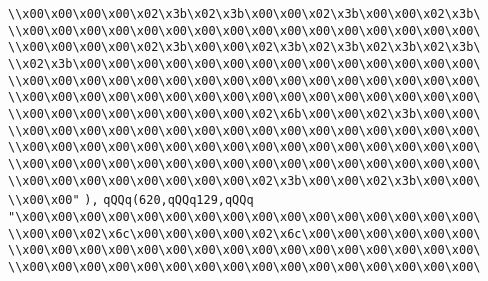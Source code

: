 \verb|\\x00\x00\x00\x00\x02\x3b\x02\x3b\x00\x00\x02\x3b\x00\x00\x02\x3b\|\newline
\verb|\\x00\x00\x00\x00\x00\x00\x00\x00\x00\x00\x00\x00\x00\x00\x00\x00\|\newline
\verb|\\x00\x00\x00\x00\x02\x3b\x00\x00\x02\x3b\x02\x3b\x02\x3b\x02\x3b\|\newline
\verb|\\x02\x3b\x00\x00\x00\x00\x00\x00\x00\x00\x00\x00\x00\x00\x00\x00\|\newline
\verb|\\x00\x00\x00\x00\x00\x00\x00\x00\x00\x00\x00\x00\x00\x00\x00\x00\|\newline
\verb|\\x00\x00\x00\x00\x00\x00\x00\x00\x00\x00\x00\x00\x00\x00\x00\x00\|\newline
\verb|\\x00\x00\x00\x00\x00\x00\x00\x00\x02\x6b\x00\x00\x02\x3b\x00\x00\|\newline
\verb|\\x00\x00\x00\x00\x00\x00\x00\x00\x00\x00\x00\x00\x00\x00\x00\x00\|\newline
\verb|\\x00\x00\x00\x00\x00\x00\x00\x00\x00\x00\x00\x00\x00\x00\x00\x00\|\newline
\verb|\\x00\x00\x00\x00\x00\x00\x00\x00\x00\x00\x00\x00\x00\x00\x00\x00\|\newline
\verb|\\x00\x00\x00\x00\x00\x00\x00\x00\x02\x3b\x00\x00\x02\x3b\x00\x00\|\newline
\verb|\\x00\x00"|\newline
\verb|),|\newline
\verb|qQQq(620,qQQq129,qQQq|\newline
\verb|"\x00\x00\x00\x00\x00\x00\x00\x00\x00\x00\x00\x00\x00\x00\x00\x00\|\newline
\verb|\\x00\x00\x02\x6c\x00\x00\x00\x00\x02\x6c\x00\x00\x00\x00\x00\x00\|\newline
\verb|\\x00\x00\x00\x00\x00\x00\x00\x00\x00\x00\x00\x00\x00\x00\x00\x00\|\newline
\verb|\\x00\x00\x00\x00\x00\x00\x00\x00\x00\x00\x00\x00\x00\x00\x00\x00\|\newline
